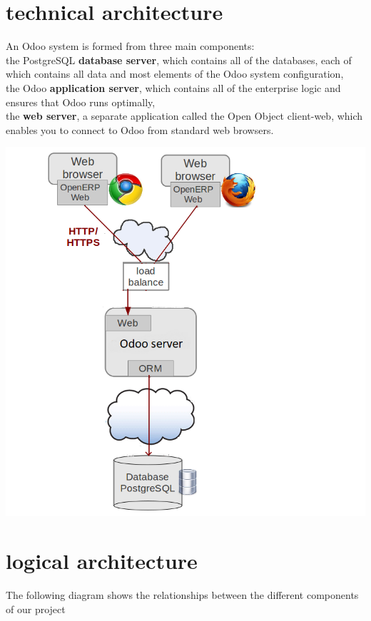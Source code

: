     
\section{technical architecture}  
An Odoo system is formed from three main components:\\
the PostgreSQL \textbf{database server}, which contains all of the databases, each of which contains all data and most elements of the Odoo system configuration,\\
the Odoo \textbf{application server}, which contains all of the enterprise logic and ensures that Odoo runs optimally,\\
the \textbf{web server}, a separate application called the Open Object client-web, which enables you to connect to Odoo from standard web browsers.
       \begin{center}
         \includegraphics[scale=0.5]{img/terp_arch_1.png}\\
       \end{center}
\section{logical architecture}  
The following diagram shows the relationships between the different components of our project  

